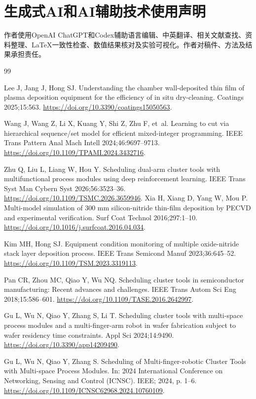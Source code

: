 \documentclass[final,5p,times,twocolumn]{elsarticle}
\begin{document}
\section*{生成式AI和AI辅助技术使用声明}
作者使用OpenAI ChatGPT和Codex辅助语言编辑、中英翻译、相关文献查找、资料整理、LaTeX一致性检查、数值结果核对及实验可视化。作者对稿件、方法及结果承担责任。

\FloatBarrier
\small
\setlength{\bibsep}{0pt}
\begin{thebibliography}{99}


Lee J, Jang J, Hong SJ. Understanding the chamber wall-deposited thin film of plasma deposition equipment for the efficiency of in situ dry-cleaning. Coatings 2025;15:563. \url{https://doi.org/10.3390/coatings15050563}.

Wang J, Wang Z, Li X, Kuang Y, Shi Z, Zhu F, et~al. Learning to cut via hierarchical sequence/set model for efficient mixed-integer programming. IEEE Trans Pattern Anal Mach Intell 2024;46:9697--9713. \url{https://doi.org/10.1109/TPAMI.2024.3432716}.

Zhu Q, Liu L, Liang W, Hou Y. Scheduling dual-arm cluster tools with multifunctional process modules using deep reinforcement learning. IEEE Trans Syst Man Cybern Syst 2026;56:3523--36. \url{https://doi.org/10.1109/TSMC.2026.3659946}.
Xia H, Xiang D, Yang W, Mou P. Multi-model simulation of 300 mm silicon-nitride thin-film deposition by PECVD and experimental verification.
Surf Coat Technol 2016;297:1--10.
\url{https://doi.org/10.1016/j.surfcoat.2016.04.034}.

Kim MH, Hong SJ. Equipment condition monitoring of multiple oxide-nitride stack layer deposition process.
IEEE Trans Semicond Manuf 2023;36:645--52.
\url{https://doi.org/10.1109/TSM.2023.3319113}.

Pan CR, Zhou MC, Qiao Y, Wu NQ. Scheduling cluster tools in semiconductor manufacturing: Recent advances and challenges.
IEEE Trans Autom Sci Eng 2018;15:586--601.
\url{https://doi.org/10.1109/TASE.2016.2642997}.

Gu L, Wu N, Qiao Y, Zhang S, Li T. Scheduling cluster tools with multi-space process modules and a multi-finger-arm robot in wafer fabrication subject to wafer residency time constraints.
Appl Sci 2024;14:9490.
\url{https://doi.org/10.3390/app14209490}.

Gu L, Wu N, Qiao Y, Zhang S. Scheduling of {Multi-finger-robotic Cluster Tools} with {Multi-space Process Modules}.
In: 2024 International Conference on Networking, Sensing and Control ({ICNSC}). IEEE; 2024, p. 1--6.
\url{https://doi.org/10.1109/ICNSC62968.2024.10760109}.


\end{thebibliography}
\end{document}
